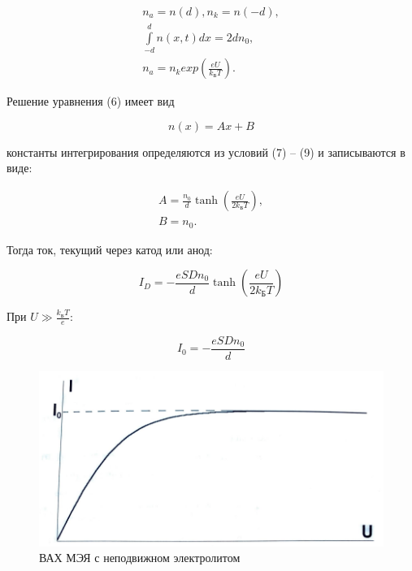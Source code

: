 \documentclass[a4paper,12pt]{article}
\begin{document}
\begin{gather}
n_a = n(d), n_k = n(-d), \\
%
\int\limits_{-d}^{d} n(x,t) dx = 2 d n_0	, \\
%
n_a = n_k exp\left(\frac{eU}{k_{Б} T}\right).
\end{gather}

Решение уравнения (6) имеет вид

\begin{equation}
n(x) = Ax + B
\end{equation}

константы интегрирования определяются из условий (7) -- (9) и записываются в виде:

\begin{gather}
A = \frac{n_0}{d} \tanh\left(\frac{eU}{2 k_{Б} T}\right), \\
%
B = n_0.
\end{gather}

Тогда ток, текущий через катод или анод:

\begin{equation}
I_D  = - \frac{e S D n_0}{d} \tanh\left(\frac{eU}{2 k_{Б} T}\right)
\end{equation}

При $U \gg \frac{k_{Б} T}{e}$:

\begin{equation}
I_0 = - \frac{e S D n_0}{d}
\end{equation}

\newpage

\begin{figure}[h]
	\begin{center}
		\includegraphics[scale=0.8]{fig3}
		\caption{ВАХ МЭЯ с неподвижном электролитом}
		\label{VAH}
	\end{center}
\end{figure}
\end{document}
